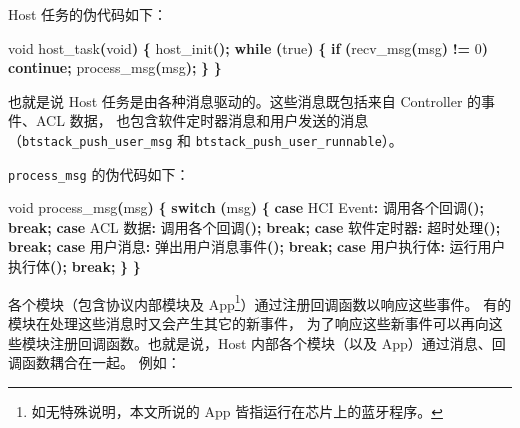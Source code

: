 \documentclass[
  12pt,
]{book}
\newenvironment{Shaded}{\begin{snugshade}}{\end{snugshade}}
\newcommand{\ControlFlowTok}[1]{\textcolor[rgb]{0.13,0.29,0.53}{\textbf{#1}}}
\newcommand{\DataTypeTok}[1]{\textcolor[rgb]{0.13,0.29,0.53}{#1}}
\newcommand{\DecValTok}[1]{\textcolor[rgb]{0.00,0.00,0.81}{#1}}
\newcommand{\NormalTok}[1]{#1}
\newcommand{\OperatorTok}[1]{\textcolor[rgb]{0.81,0.36,0.00}{\textbf{#1}}}
\begin{document}
Host 任务的伪代码如下：

\begin{Shaded}
\begin{Highlighting}[]
\DataTypeTok{void}\NormalTok{ host\_task}\OperatorTok{(}\DataTypeTok{void}\OperatorTok{)}
\OperatorTok{\{}
\NormalTok{    host\_init}\OperatorTok{();}
    \ControlFlowTok{while} \OperatorTok{(}\NormalTok{true}\OperatorTok{)}
    \OperatorTok{\{}
        \ControlFlowTok{if} \OperatorTok{(}\NormalTok{recv\_msg}\OperatorTok{(}\NormalTok{msg}\OperatorTok{)} \OperatorTok{!=} \DecValTok{0}\OperatorTok{)} \ControlFlowTok{continue}\OperatorTok{;}
\NormalTok{        process\_msg}\OperatorTok{(}\NormalTok{msg}\OperatorTok{);}
    \OperatorTok{\}}
\OperatorTok{\}}
\end{Highlighting}
\end{Shaded}

也就是说 Host 任务是由各种消息驱动的。这些消息既包括来自 Controller 的事件、ACL 数据，
也包含软件定时器消息和用户发送的消息（\texttt{btstack\_push\_user\_msg} 和 \texttt{btstack\_push\_user\_runnable}）。

\texttt{process\_msg} 的伪代码如下：

\begin{Shaded}
\begin{Highlighting}[]
\DataTypeTok{void}\NormalTok{ process\_msg}\OperatorTok{(}\NormalTok{msg}\OperatorTok{)}
\OperatorTok{\{}
    \ControlFlowTok{switch} \OperatorTok{(}\NormalTok{msg}\OperatorTok{)}
    \OperatorTok{\{}
    \ControlFlowTok{case}\NormalTok{ HCI Event}\OperatorTok{:}
\NormalTok{        调用各个回调}\OperatorTok{();}
        \ControlFlowTok{break}\OperatorTok{;}
    \ControlFlowTok{case}\NormalTok{ ACL 数据}\OperatorTok{:}
\NormalTok{        调用各个回调}\OperatorTok{();}
        \ControlFlowTok{break}\OperatorTok{;}
    \ControlFlowTok{case}\NormalTok{ 软件定时器}\OperatorTok{:}
\NormalTok{        超时处理}\OperatorTok{();}
        \ControlFlowTok{break}\OperatorTok{;}
    \ControlFlowTok{case}\NormalTok{ 用户消息}\OperatorTok{:}
\NormalTok{        弹出用户消息事件}\OperatorTok{();}
        \ControlFlowTok{break}\OperatorTok{;}
    \ControlFlowTok{case}\NormalTok{ 用户执行体}\OperatorTok{:}
\NormalTok{        运行用户执行体}\OperatorTok{();}
        \ControlFlowTok{break}\OperatorTok{;}
    \OperatorTok{\}}
\OperatorTok{\}}
\end{Highlighting}
\end{Shaded}

各个模块（包含协议内部模块及 App\footnote{如无特殊说明，本文所说的 App 皆指运行在芯片上的蓝牙程序。}）通过注册回调函数以响应这些事件。
有的模块在处理这些消息时又会产生其它的新事件，
为了响应这些新事件可以再向这些模块注册回调函数。也就是说，Host 内部各个模块（以及 App）通过消息、回调函数耦合在一起。
例如：
\end{document}
